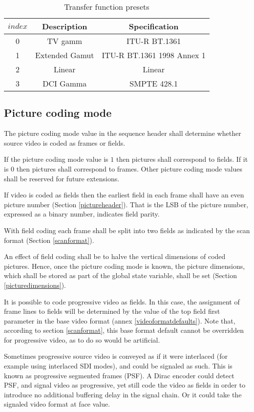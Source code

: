 \begin{table}[!ht]
\centering
\begin{tabular}{|c|c|c|}
\hline
\rowcolor[gray]{0.75}$index$ & {\bf Description} & {\bf Specification}\\
\hline
0 & TV gamm & ITU-R BT.1361\\ 
\hline
1 & Extended Gamut & ITU-R BT.1361 1998 Annex 1\\
\hline
2 & Linear & Linear\\
\hline
3 & DCI Gamma & SMPTE 428.1\\
\hline
\end{tabular}
\caption{Transfer function presets}\label{table:transfervalues}
\end{table}

\subsection{Picture coding mode}
\label{picturecodingmode}

The picture coding mode value in the sequence header shall determine 
whether source video is coded as frames or fields. 

If the picture coding mode value is $1$ then pictures shall correspond to fields. 
If it is $0$ then pictures shall correspond to frames. Other picture coding mode 
values shall be reserved for future extensions.

If video is coded as fields then the earliest field in each frame shall have 
an even picture number (Section \ref{pictureheader}). That is the LSB of the 
picture number, expressed as a binary number, indicates field parity.

With field coding each frame shall be split into two fields as indicated 
by the scan format (Section \ref{scanformat}).

An effect of field coding shall be to halve the vertical dimensions of 
coded pictures. Hence, once the picture coding mode is known, the 
picture dimensions, which shall be stored as part of the global 
state variable, shall be set (Section \ref{picturedimensions}).

\begin{informative}
It is possible to code progressive video as fields. In this case, 
the assignment of frame lines to fields will be determined by the 
value of the top field first parameter in the base video format 
(annex \ref{videoformatdefaults}). Note that, according to 
section \ref{scanformat}, this base format default cannot be overridden 
for progressive video, as to do so would be artificial.

Sometimes progressive source video is conveyed as if it were interlaced
(for example using interlaced SDI modes), and could be signaled as such.
This is known as progressive segmented frames (PSF). A Dirac encoder could
detect PSF, and signal video as progressive, yet still code the video as 
fields in order to introduce no additional buffering delay in the signal
chain. Or it could take the signaled video format at face value.
\end{informative}

